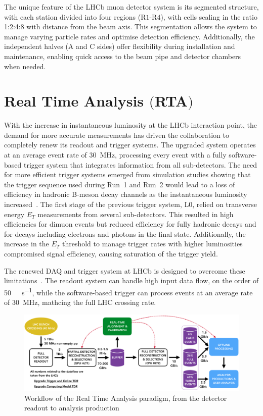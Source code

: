 The unique feature of the LHCb muon detector system is its segmented structure, with each station divided into four regions (R$1$-R$4$), with cells scaling in the ratio 1:2:4:8 with distance from the beam axis. This segmentation allows the system to manage varying particle rates and optimise detection efficiency. Additionally, the independent halves (A and C sides) offer flexibility during installation and maintenance, enabling quick access to the beam pipe and detector chambers when needed.


\section[Real Time Analysis]{Real Time Analysis $\bigl($RTA$\bigr)$}\label{sec:rta}

With the increase in instantaneous luminosity at the LHCb interaction point, the demand for more accurate measurements has driven the collaboration to completely renew its readout and trigger systems. The upgraded system operates at an average event rate of \SI{30}{\mega\hertz}, processing every event with a fully software-based trigger system that integrates information from all sub-detectors. The need for more efficient trigger systems emerged from simulation studies showing that the trigger sequence used during Run~1 and Run~2 would lead to a loss of efficiency in hadronic B-meson decay channels as the instantaneous luminosity increased~\cite{CERN-LHCC-2011-001}. The first stage of the previous trigger system, L$0$, relied on transverse energy $E_T$ measurements from several sub-detectors. This resulted in high efficiencies for dimuon events but reduced efficiency for fully hadronic decays and for decays including electrons and photons in the final state. Additionally, the increase in the $E_T$ threshold to manage trigger rates with higher luminosities compromised signal efficiency, causing saturation of the trigger yield.

The renewed DAQ and trigger system at LHCb is designed to overcome these limitations~\cite{CERN-LHCC-2018-014}. The readout system can handle high input data flow, on the order of \SI[per-mode=symbol]{50}{\tera\bit\per\second}, while the software-based trigger can process events at an average rate of \SI{30}{\mega\hertz}, mathcing the full LHC crossing rate.

\begin{figure}
    \centering
    \includegraphics[width=\textwidth]{figures/hidef_RTA_dataflow_widescreen.png}
    \caption{Workflow of the Real Time Analysis paradigm, from the detector readout to analysis production}
    \label{fig:RTA}
\end{figure}

